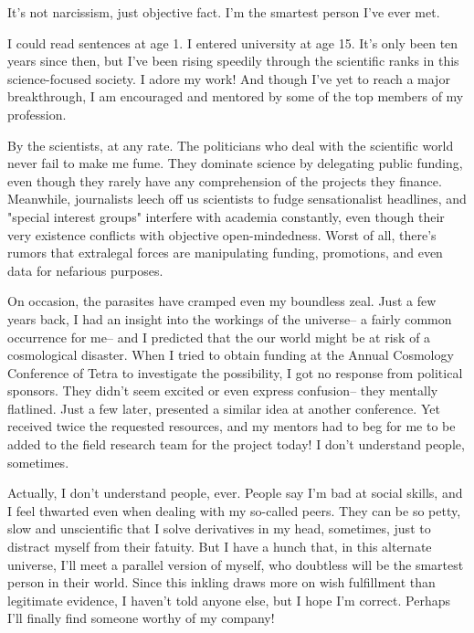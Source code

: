 \documentclass[char]{guildcamp3}
\begin{document}
\name{\cSciTwo{}}


It's not narcissism, just objective fact. I'm the smartest person I've ever met.

I could read sentences at age 1. I entered university at age 15. It's only been ten years since then, but I've been rising speedily through the scientific ranks in this science-focused society. I adore my work! And though I've yet to reach a major breakthrough, I am encouraged and mentored by some of the top members of my profession.

By the scientists, at any rate. The politicians who deal with the scientific world never fail to make me fume. They dominate science by delegating public funding, even though they rarely have any comprehension of the projects they finance. Meanwhile, journalists leech off us scientists to fudge sensationalist headlines, and "special interest groups" interfere with academia constantly, even though their very existence conflicts with objective open-mindedness. Worst of all, there's rumors that extralegal forces are manipulating funding, promotions, and even data for nefarious purposes.

On occasion, the parasites have cramped even my boundless zeal. Just a few years back, I had an insight into the workings of the universe-- a fairly common occurrence for me-- and I predicted that the our world might be at risk of a cosmological disaster. When I tried to obtain funding at the Annual Cosmology Conference of Tetra to investigate the possibility, I got no response from political sponsors. They didn't seem excited or even express confusion-- they mentally flatlined. Just a few later, \cSciOne{} presented a similar idea at another conference. Yet \cSciOne{\they} received twice the requested resources, and my mentors had to beg for me to be added to the field research team for the project today! I don't understand people, sometimes.

Actually, I don't understand people, ever. People say I'm bad at social skills, and I feel thwarted even when dealing with my so-called peers. They can be so petty, slow and unscientific that I solve derivatives in my head, sometimes, just to distract myself from their fatuity. But I have a hunch that, in this alternate universe, I'll meet a parallel version of myself, who doubtless will be the smartest person in their world. Since this inkling draws more on wish fulfillment than legitimate evidence, I haven't told anyone else, but I hope I'm correct. Perhaps I'll finally find someone worthy of my company!
\end{document}
